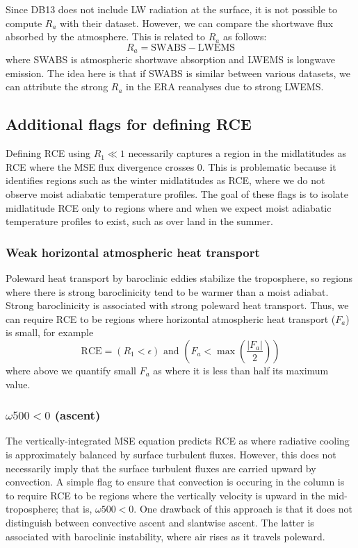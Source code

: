 \documentclass[11pt]{article}
\begin{document}
Since DB13 does not include LW radiation at the surface, it is not possible to compute \(R_a\) with their dataset. However, we can compare the shortwave flux absorbed by the atmosphere. This is related to \(R_a\) as follows:
\begin{equation}
R_a = \mathrm{SWABS} - \mathrm{LWEMS}
\end{equation}
where SWABS is atmospheric shortwave absorption and LWEMS is longwave emission. The idea here is that if SWABS is similar between various datasets, we can attribute the strong \(R_a\) in the ERA reanalyses due to strong LWEMS.

\subsection{Additional flags for defining RCE}
\label{sec:org8053936}
Defining RCE using \(R_1 \ll 1\) necessarily captures a region in the midlatitudes as RCE where the MSE flux divergence crosses 0. This is problematic because it identifies regions such as the winter midlatitudes as RCE, where we do not observe moist adiabatic temperature profiles. The goal of these flags is to isolate midlatitude RCE only to regions where and when we expect moist adiabatic temperature profiles to exist, such as over land in the summer.
\subsubsection{Weak horizontal atmospheric heat transport}
\label{sec:org2467533}
Poleward heat transport by baroclinic eddies stabilize the troposphere, so regions where there is strong baroclinicity tend to be warmer than a moist adiabat. Strong baroclinicity is associated with strong poleward heat transport. Thus, we can require RCE to be regions where horizontal atmospheric heat transport (\(F_a\)) is small, for example
\begin{equation}
    \mathrm{RCE} = (R_1 < \epsilon) \text{ and } \left(F_a < \max\left(\frac{|F_a|}{2}\right)\right)
\end{equation}
where above we quantify small \(F_a\) as where it is less than half its maximum value.
\subsubsection{\(\omega500<0\) (ascent)}
\label{sec:orgbd89dd0}
The vertically-integrated MSE equation predicts RCE as where radiative cooling is approximately balanced by surface turbulent fluxes. However, this does not necessarily imply that the surface turbulent fluxes are carried upward by convection. A simple flag to ensure that convection is occuring in the column is to require RCE to be regions where the vertically velocity is upward in the mid-troposphere; that is, \(\omega500<0\). One drawback of this approach is that it does not distinguish between convective ascent and slantwise ascent. The latter is associated with baroclinic instability, where air rises as it travels poleward.
\end{document}
